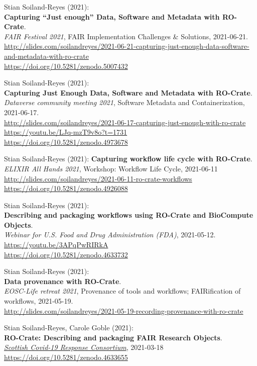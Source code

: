 Stian Soiland-Reyes (2021):\\
\textbf{Capturing ``Just enough'' Data, Software and Metadata with RO-Crate}.\\
\emph{FAIR Festival 2021}, FAIR Implementation Challenges \& Solutions, 2021-06-21. \\
\url{http://slides.com/soilandreyes/2021-06-21-capturing-just-enough-data-software-and-metadata-with-ro-crate}\\
\url{https://doi.org/10.5281/zenodo.5007432}

Stian Soiland-Reyes (2021):\\
\textbf{Capturing Just Enough Data, Software and Metadata with RO-Crate}.\\
\emph{{Dataverse community meeting 2021}}, Software Metadata and Containerization, 2021-06-17.\\
\url{http://slides.com/soilandreyes/2021-06-17-capturing-just-enough-with-ro-crate}\\
\url{https://youtu.be/LJq-mzT9v8o?t=1731} \\
\url{https://doi.org/10.5281/zenodo.4973678}

Stian Soiland-Reyes (2021):
\textbf{Capturing workflow life cycle with RO-Crate}.\\
\emph{ELIXIR All Hands 2021}, Workshop: Workflow Life Cycle, 2021-06-11\\
\url{http://slides.com/soilandreyes/2021-06-11-ro-crate-workflows}
\url{https://doi.org/10.5281/zenodo.4926088}

Stian Soiland-Reyes (2021):\\
\textbf{Describing and packaging workflows using RO-Crate and BioCompute Objects}.\\
\emph{Webinar for U.S. Food and Drug Administration (FDA)}, 2021-05-12.
\url{https://youtu.be/3APqPwRIRkA} \\
\url{https://doi.org/10.5281/zenodo.4633732}

Stian Soiland-Reyes (2021):\\
{\textbf{Data provenance with RO-Crate}}.\\
\emph{EOSC-Life retreat 2021}, Provenance of tools and workflows;
FAIRification of workflows, 2021-05-19.\\
\url{http://slides.com/soilandreyes/2021-05-19-recording-provenance-with-ro-crate}

Stian Soiland-Reyes, Carole Goble (2021):\\
\textbf{RO-Crate: Describing and packaging FAIR Research Objects}.\\
\emph{\href{https://www.gla.ac.uk/research/az/scrc/}{Scottish Covid-19
Response Consortium}}, 2021-03-18
\url{https://doi.org/10.5281/zenodo.4633655}

